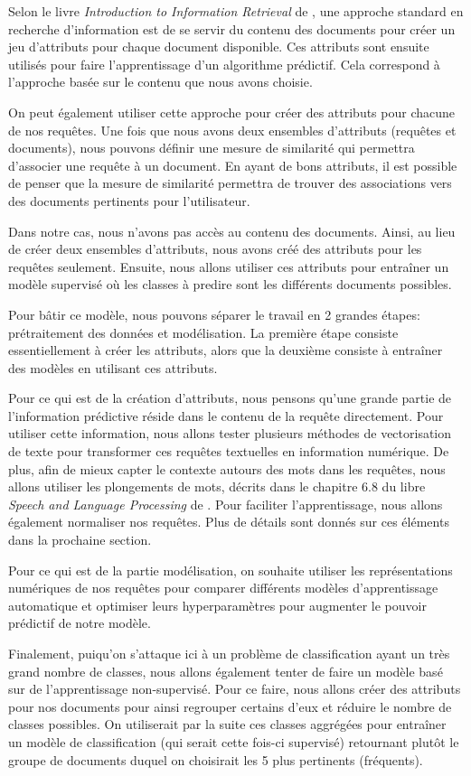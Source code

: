 
Selon le livre \emph{Introduction to Information Retrieval} de \cite{schutze2008introduction}, une approche standard en recherche d'information est de se servir du contenu des documents pour créer un jeu d'attributs pour chaque document disponible. Ces attributs sont ensuite utilisés pour faire l'apprentissage d'un algorithme prédictif. Cela correspond à l'approche basée sur le contenu que nous avons choisie.

On peut également utiliser cette approche pour créer des attributs pour chacune de nos requêtes. Une fois que nous avons deux ensembles d'attributs (requêtes et documents), nous pouvons définir une mesure de similarité qui permettra d'associer une requête à un document. En ayant de bons attributs, il est possible de penser que la mesure de similarité permettra de trouver des associations vers des documents pertinents pour l'utilisateur.

Dans notre cas, nous n'avons pas accès au contenu des documents. Ainsi, au lieu de créer deux ensembles d'attributs, nous avons créé des attributs pour les requêtes seulement. Ensuite, nous allons utiliser ces attributs pour entraîner un modèle supervisé où les classes à predire sont les différents documents possibles.
\break

Pour bâtir ce modèle, nous pouvons séparer le travail en 2 grandes étapes: prétraitement des données et modélisation. La première étape consiste essentiellement à créer les attributs, alors que la deuxième consiste à entraîner des modèles en utilisant ces attributs.

Pour ce qui est de la création d'attributs, nous pensons qu'une grande partie de l'information prédictive réside dans le contenu de la requête directement. Pour utiliser cette information, nous allons tester plusieurs méthodes de vectorisation de texte pour transformer ces requêtes textuelles en information numérique. De plus, afin de mieux capter le contexte autours des mots dans les requêtes, nous allons utiliser les plongements de mots, décrits dans le chapitre 6.8 du libre \emph{Speech and Language Processing} de \cite{jurafsky2014speech}. Pour faciliter l'apprentissage, nous allons également normaliser nos requêtes. Plus de détails sont donnés sur ces éléments dans la prochaine section.

Pour ce qui est de la partie modélisation, on souhaite utiliser les représentations numériques de nos requêtes pour comparer différents modèles d'apprentissage automatique et optimiser leurs hyperparamètres pour augmenter le pouvoir prédictif de notre modèle.
\break

Finalement, puiqu'on s'attaque ici à un problème de classification ayant un très grand nombre de classes, nous allons également tenter de faire un modèle basé sur de l'apprentissage non-supervisé. Pour ce faire, nous allons créer des attributs pour nos documents pour ainsi regrouper certains d'eux et réduire le nombre de classes possibles. On utiliserait par la suite ces classes aggrégées pour entraîner un modèle de classification (qui serait cette fois-ci supervisé) retournant plutôt le groupe de documents duquel on choisirait les 5 plus pertinents (fréquents).

